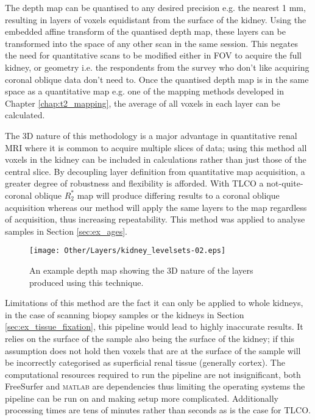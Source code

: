 The depth map can be quantised to any desired precision e.g. the nearest 1 mm, resulting in layers of voxels equidistant from the surface of the kidney. Using the embedded affine transform of the quantised depth map, these layers can be transformed into the space of any other scan in the same session. This negates the need for quantitative scans to be modified either in \ac{FOV} to acquire the full kidney, or geometry i.e. the respondents from the survey who don't like acquiring coronal oblique data don't need to. Once the quantised depth map is in the same space as a quantitative map e.g. one of the \ttwo mapping methods developed in Chapter \ref{chap:t2_mapping}, the average of all voxels in each layer can be calculated.

The 3D nature of this methodology is a major advantage in quantitative renal \ac{MRI} where it is common to acquire multiple slices of data; using this method all voxels in the kidney can be included in calculations rather than just those of the central slice. By decoupling layer definition from quantitative map acquisition, a greater degree of robustness and flexibility is afforded. With \ac{TLCO} a not-quite-coronal oblique $R_2^*$ map will produce differing results to a coronal oblique acquisition whereas our method will apply the same layers to the map regardless of acquisition, thus increasing repeatability. This method was applied to analyse samples in Section \ref{sec:ex_ages}.

\begin{figure}[H]
	\centering
	\texttt{[image: Other/Layers/kidney\_levelsets-02.eps]}
	\caption{An example depth map showing the 3D nature of the layers produced using this technique.}
	\label{fig:ex_layers_kidney}
\end{figure}

Limitations of this method are the fact it can only be applied to whole kidneys, in the case of scanning biopsy samples or the kidneys in Section \ref{sec:ex_tissue_fixation}, this pipeline would lead to highly inaccurate results. It relies on the surface of the sample also being the surface of the kidney; if this assumption does not hold then voxels that are at the surface of the sample will be incorrectly categorised as superficial renal tissue (generally cortex). The computational resources required to run the pipeline are not insignificant, both FreeSurfer and \textsc{matlab} are dependencies thus limiting the operating systems the pipeline can be run on and making setup more complicated. Additionally processing times are tens of minutes rather than seconds as is the case for \ac{TLCO}.

